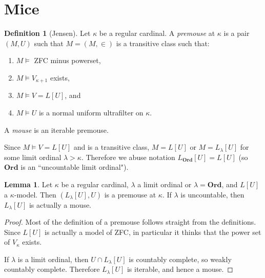 \documentclass[12pt]{report}
\newcommand{\Ord}{\mathbf{Ord}}
\newcommand{\dfn}[1]{\emph{#1}\index{#1}}
\theoremstyle{definition}
\newtheorem{lemma}[theorem]{Lemma}
\newtheorem{definition}[theorem]{Definition}
\begin{document}
\section{Mice}
\begin{definition}[Jensen]
Let $\kappa$ be a regular cardinal.
A \dfn{premouse} at $\kappa$ is a pair $(M, U)$ such that $M = (M, \in)$ is a transitive class such that:
\begin{enumerate}
\item $M \models $ ZFC minus powerset,
\item $M \models V_{\kappa + 1}$ exists,
\item $M \models V = L[U]$, and
\item $M \models U$ is a normal uniform ultrafilter on $\kappa$.
\end{enumerate}
A \dfn{mouse} is an iterable premouse.
\end{definition}
Since $M \models V = L[U]$ and is a transitive class, $M = L[U]$ or $M = L_\lambda[U]$ for some limit ordinal $\lambda > \kappa$.
Therefore we abuse notation $L_\Ord[U] = L[U]$ (so $\Ord$ is an ``uncountable limit ordinal").
\begin{lemma}
Let $\kappa$ be a regular cardinal, $\lambda$ a limit ordinal or $\lambda = \Ord$, and $L[U]$ a $\kappa$-model. Then $(L_\lambda[U], U)$ is a premouse at $\kappa$. If $\lambda$ is uncountable, then $L_\lambda[U]$ is actually a mouse.
\end{lemma}
\begin{proof}
Most of the definition of a premouse follows straight from the definitions. Since $L[U]$ is actually a model of ZFC, in particular it thinks that the power set of $V_\kappa$ exists.

If $\lambda$ is a limit ordinal, then $U \cap L_\lambda[U]$ is countably complete, so weakly countably complete. Therefore $L_\lambda[U]$ is iterable, and hence a mouse.
\end{proof}
\end{document}
